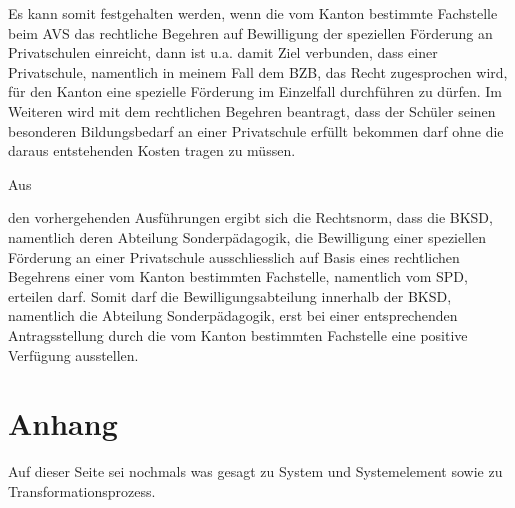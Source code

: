 \documentclass[10pt,parskip]{scrbook}
\newcounter{rz}
\newcommand{\Rz}{\addtocounter{rz}{1}\marginpar{\texttt{\textit{A\arabic{rz}}}}}
\newcommand{\RzLabel}[1]{\refstepcounter{rz}\label{#1}\marginpar{\texttt{\textit{A\arabic{rz}}}}}
\begin{document}
Es \RzLabel{RW} kann somit festgehalten werden, wenn die vom Kanton bestimmte Fachstelle beim AVS das rechtliche Begehren auf Bewilligung der speziellen Förderung an Privatschulen einreicht, dann ist u.a. damit Ziel verbunden, dass einer Privatschule, namentlich in meinem Fall dem BZB, das Recht zugesprochen wird, für den Kanton eine spezielle Förderung im Einzelfall durchführen zu dürfen. Im Weiteren wird mit dem rechtlichen Begehren beantragt, dass der Schüler seinen besonderen Bildungsbedarf an einer Privatschule erfüllt bekommen darf ohne die daraus entstehenden Kosten tragen zu müssen. 


Aus \Rz den vorhergehenden Ausführungen ergibt sich die Rechtsnorm, dass die BKSD, namentlich deren Abteilung Sonderpädagogik, die Bewilligung einer speziellen Förderung an einer Privatschule ausschliesslich auf Basis eines rechtlichen Begehrens einer vom Kanton bestimmten Fachstelle, namentlich vom SPD, erteilen darf. Somit darf die Bewilligungsabteilung innerhalb der BKSD, namentlich die Abteilung Sonderpädagogik, erst bei einer entsprechenden Antragsstellung durch die vom Kanton bestimmten Fachstelle eine positive Verfügung ausstellen.\\ 

\chapter{Anhang}
Auf dieser Seite sei nochmals was gesagt zu System und
Systemelement sowie zu
Transformationsprozess.

\newpage


\printindex



\printbibliography[heading=none,keyword=Gesetzestext]
\end{document}
